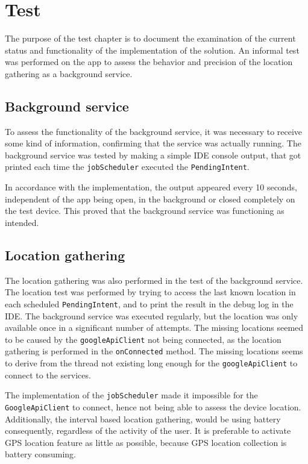 \section{Test}
The purpose of the test chapter is to document the examination of the current status and functionality of the implementation of the solution.
An informal test was performed on the app to assess the behavior and precision of the location gathering as a background service.

\subsection{Background service}
To assess the functionality of the background service, it was necessary to receive some kind of information, confirming that the service was actually running.
The background service was tested by making a simple IDE console output, that got printed each time the \texttt{jobScheduler} executed the \texttt{PendingIntent}.

In accordance with the implementation, the output appeared every 10 seconds, independent of the app being open, in the background or closed completely on the test device.
This proved that the background service was functioning as intended.

\subsection{Location gathering}
The location gathering was also performed in the test of the background service.
The location test was performed by trying to access the last known location in each scheduled \texttt{PendingIntent}, and to print the result in the debug log in the IDE.
The background service was executed regularly, but the location was only available once in a significant number of attempts.
The missing locations seemed to be caused by the \texttt{googleApiClient} not being connected, as the location gathering is performed in the \texttt{onConnected} method.
The missing locations seems to derive from the thread not existing long enough for the \texttt{googleApiClient} to connect to the services.

The implementation of the \texttt{jobScheduler} made it impossible for the \texttt{GoogleApiClient} to connect, hence not being able to assess the device location.
Additionally, the interval based location gathering, would be using battery consequently, regardless of the activity of the user. 
It is preferable to activate GPS location feature as little as possible, because GPS location collection is battery consuming.
